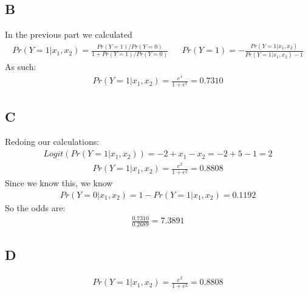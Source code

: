 \documentclass{article}
\begin{document}
\subsection*{B}
In the previous part we calculated 
\begin{align*}
Pr(Y=1|x_1,x_2) = \frac{Pr(Y=1)/Pr(Y=0)}{1+Pr(Y=1)/Pr(Y=0)} && Pr(Y=1) = -\frac{Pr(Y=1|x_1,x_2)}{Pr(Y=1|x_1,x_2)-1}
\end{align*}
As such:
\begin{align*}
Pr(Y=1|x_1,x_2) = \frac{e^1}{1+e^1} = 0.7310
\end{align*}


\subsection*{C}
Redoing our calculations:
\begin{align*}
Logit(Pr(Y=1|x_1,x_2)) = -2 + x_1 - x_2 = -2 + 5 -1 = 2
\end{align*}
\begin{align*}
Pr(Y=1|x_1,x_2) = \frac{e^2}{1+e^2} = 0.8808
\end{align*}
Since we know this, we know
\begin{align*}
Pr(Y=0|x_1,x_2) = 1-Pr(Y=1|x_1,x_2) = 0.1192
\end{align*}
So the odds are:
\begin{align*}
\boxed{ \frac{0.7310}{0.2689} = 7.3891 }
\end{align*}
\subsection*{D}
\begin{align*}
Pr(Y=1|x_1,x_2) = \frac{e^2}{1+e^2} = 0.8808
\end{align*}
\end{document}
